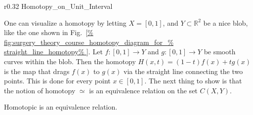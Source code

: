 \documentclass[crop=false,class=article,oneside]{standalone}
\begin{document}
        \begin{wrapfigure}[8]{r}{0.32\textwidth}
            \centering
            \captionsetup{type=figure}
            \vspace{-1ex}
            {Homotopy_on_Unit_Interval}
            \caption{Straight-Line Homotopy.}
            \label{fig:surgery_theory_course_homotopy_diagram_%
                   for_straight_line_homotopy}
        \end{wrapfigure}
        One can visualize a homotopy by letting $X=[0,1]$,
        and $Y\subset\mathbb{R}^{2}$ be a nice blob,
        like the one shown in
        Fig.~\ref{%
            fig:surgery_theory_course_homotopy_diagram_for_%
            straight_line_homotopy%
        }.
        Let $f:[0,1]\rightarrow Y$ and $g:[0,1]\rightarrow Y$
        be smooth curves within the blob. Then the homotopy
        $H(x,t)=(1-t)f(x)+tg(x)$ is the map that drags $f(x)$
        to $g(x)$ via the straight line connecting the two
        points. This is done for every point $x\in [0,1]$.
        The next thing to show is that the notion of
        homotopy $\simeq$ is an equivalence relation on the
        set $C(X,Y)$.
        \begin{theorem}
            Homotopic is an equivalence relation.
        \end{theorem}
\end{document}

